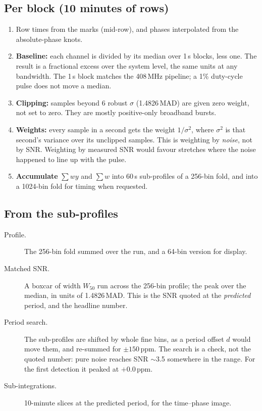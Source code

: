 \documentclass[11pt,a4paper]{article}
\begin{document}
\subsection{Per block (10 minutes of rows)}
\begin{enumerate}
\item Row times from the marks (mid-row), and phases interpolated from the absolute-phase knots.
\item \textbf{Baseline:} each channel is divided by its median over 1\,s blocks, less one. The result is a fractional excess over the system level, the same units at any bandwidth. The 1\,s block matches the 408\,MHz pipeline; a 1\% duty-cycle pulse does not move a median.
\item \textbf{Clipping:} samples beyond 6 robust $\sigma$ (1.4826\,MAD) are given zero weight, not set to zero. They are mostly positive-only broadband bursts.
\item \textbf{Weights:} every sample in a second gets the weight $1/\sigma^2$, where $\sigma^2$ is that second's variance over its unclipped samples. This is weighting by \emph{noise}, not by SNR. Weighting by measured SNR would favour stretches where the noise happened to line up with the pulse.
\item \textbf{Accumulate} $\sum w y$ and $\sum w$ into 60\,s sub-profiles of a 256-bin fold, and into a 1024-bin fold for timing when requested.
\end{enumerate}

\subsection{From the sub-profiles}
\begin{description}
\item[Profile.] The 256-bin fold summed over the run, and a 64-bin version for display.
\item[Matched SNR.] A boxcar of width $W_{50}$ run across the 256-bin profile; the peak over the median, in units of 1.4826\,MAD. This is the SNR quoted at the \emph{predicted} period, and the headline number.
\item[Period search.] The sub-profiles are shifted by whole fine bins, as a period offset $d$ would move them, and re-summed for $\pm150$\,ppm. The search is a check, not the quoted number: pure noise reaches SNR $\sim$3.5 somewhere in the range. For the first detection it peaked at $+0.0$\,ppm.
\item[Sub-integrations.] 10-minute slices at the predicted period, for the time--phase image.
\end{description}
\end{document}

